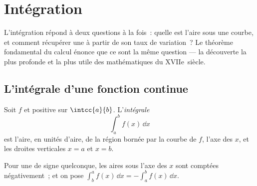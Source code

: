 \chapter{Intégration}\label{ch:g12:integ}

L'intégration répond à deux questions à la fois~: quelle est l'aire sous une
courbe, et comment récupérer une  à partir de son taux de variation~?
Le théorème fondamental du calcul énonce que ce sont la même question --- la
découverte la plus profonde et la plus utile des mathématiques du
XVIIe~siècle.

\section{L'intégrale d'une fonction continue}

\begin{definition}\label{def:g12:integ:area}
Soit $f$  et positive sur $\intcc{a}{b}$. L'\emph{intégrale}
\[
\int_a^b f(x)\,\dd x
\]
est l'aire, en unités d'aire, de la région bornée par la courbe de $f$,
l'axe des $x$, et les droites verticales $x = a$ et $x = b$.
\end{definition}

\begin{omfigure}
\end{omfigure}

Pour une  de signe quelconque, les aires sous l'axe des $x$ sont
comptées négativement~; et on pose
$\int_b^a f(x)\,\dd x = -\int_a^b f(x)\,\dd x$.

